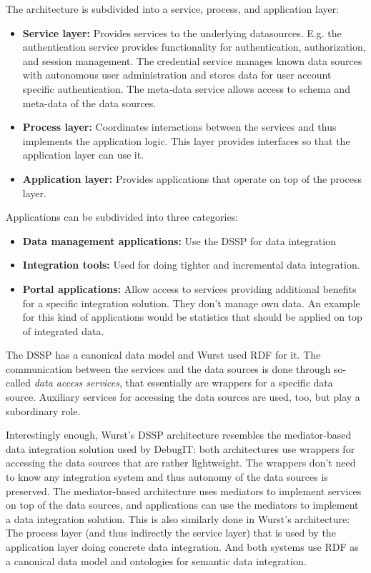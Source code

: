 The architecture is subdivided into a service, process, and application layer:
\begin{itemize}
\item \textbf{Service layer:} Provides services to the underlying datasources. E.g. the authentication service provides functionality for authentication, authorization, and session management. The credential service manages known data sources with autonomous user administration and stores data for user account specific authentication. The meta-data service allows access to schema and meta-data of the data sources.

\item \textbf{Process layer:} Coordinates interactions between the services and thus implements the application logic. This layer provides interfaces so that the application layer can use it.

\item \textbf{Application layer:} Provides applications that operate on top of the process layer.
\end{itemize}

Applications can be subdivided into three categories:
\begin{itemize}
\item \textbf{Data management applications:} Use the DSSP for data integration

\item \textbf{Integration tools:} Used for doing tighter and incremental data integration.

\item \textbf{Portal applications:} Allow access to services providing additional benefits for a specific integration solution. They don't manage own data.
An example for this kind of applications would be statistics that should be applied on top of integrated data.
\end{itemize}

The DSSP has a canonical data model and Wurst used RDF for it. 
The communication between the services and the data sources is done through so-called \emph{data access services}, that essentially are wrappers for a specific data source. Auxiliary services for accessing the data sources are used, too, but play a subordinary role. 

Interestingly enough, Wurst's DSSP architecture resembles the mediator-based data integration solution used by DebugIT: both architectures use wrappers for accessing the data sources that are rather lightweight. The wrappers don't need to know any integration system and thus autonomy of the data sources is preserved. 
The mediator-based architecture uses mediators to implement services on top of the data sources, and applications can use the mediators to implement a data integration solution.
This is also similarly done in Wurst's architecture: The process layer (and thus indirectly the service layer) that is used by the application layer doing concrete data integration. And both systems use RDF as a canonical data model and ontologies for semantic data integration.

